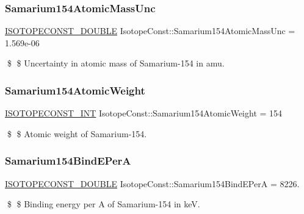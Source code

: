 \subsubsection{\texorpdfstring{Samarium154\+Atomic\+Mass\+Unc}{Samarium154AtomicMassUnc}}
{\footnotesize\ttfamily \mbox{\hyperlink{group___isotope_const-_macros_ga8f45a7272ce02c0b4c65c44636ed719a}{I\+S\+O\+T\+O\+P\+E\+C\+O\+N\+S\+T\+\_\+\+D\+O\+U\+B\+LE}} Isotope\+Const\+::\+Samarium154\+Atomic\+Mass\+Unc = 1.\+569e-\/06}

\$ \$ Uncertainty in atomic mass of Samarium-\/154 in amu. \mbox{\label{group___isotope_const-_samarium-_sm154_gad85bcdc2ce20975822de02a4fcc42a7d}} 
\subsubsection{\texorpdfstring{Samarium154\+Atomic\+Weight}{Samarium154AtomicWeight}}
{\footnotesize\ttfamily \mbox{\hyperlink{group___isotope_const-_macros_ga5f18360b3e99483a35c32d789e62621c}{I\+S\+O\+T\+O\+P\+E\+C\+O\+N\+S\+T\+\_\+\+I\+NT}} Isotope\+Const\+::\+Samarium154\+Atomic\+Weight = 154}

\$ \$ Atomic weight of Samarium-\/154. \mbox{\label{group___isotope_const-_samarium-_sm154_ga8ac043d366b8851d70d68aa80e71bbf3}} 
\subsubsection{\texorpdfstring{Samarium154\+Bind\+E\+PerA}{Samarium154BindEPerA}}
{\footnotesize\ttfamily \mbox{\hyperlink{group___isotope_const-_macros_ga8f45a7272ce02c0b4c65c44636ed719a}{I\+S\+O\+T\+O\+P\+E\+C\+O\+N\+S\+T\+\_\+\+D\+O\+U\+B\+LE}} Isotope\+Const\+::\+Samarium154\+Bind\+E\+PerA = 8226.}

\$ \$ Binding energy per A of Samarium-\/154 in keV. \mbox{\label{group___isotope_const-_samarium-_sm154_gaaf5e7fb1df10e3979dc7c48747562cdd}} 
